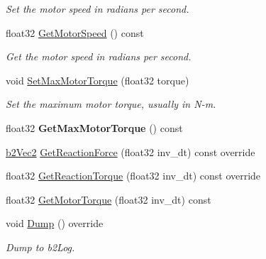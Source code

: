 \begin{DoxyCompactItemize}
\begin{DoxyCompactList}\small\item\em Set the motor speed in radians per second. \end{DoxyCompactList}\item 
\mbox{\label{classb2RevoluteJoint_abb1fa43d5779a1164ddfedf6130d7ff2}} 
float32 \mbox{\hyperlink{classb2RevoluteJoint_abb1fa43d5779a1164ddfedf6130d7ff2}{Get\+Motor\+Speed}} () const
\begin{DoxyCompactList}\small\item\em Get the motor speed in radians per second. \end{DoxyCompactList}\item 
\mbox{\label{classb2RevoluteJoint_a41779d7ec05be33e6368ef00123a3581}} 
void \mbox{\hyperlink{classb2RevoluteJoint_a41779d7ec05be33e6368ef00123a3581}{Set\+Max\+Motor\+Torque}} (float32 torque)
\begin{DoxyCompactList}\small\item\em Set the maximum motor torque, usually in N-\/m. \end{DoxyCompactList}\item 
\mbox{\label{classb2RevoluteJoint_a878308eb3e299e15ac9dc88d48671d51}} 
float32 {\bfseries Get\+Max\+Motor\+Torque} () const
\item 
\mbox{\hyperlink{structb2Vec2}{b2\+Vec2}} \mbox{\hyperlink{classb2RevoluteJoint_abeb7bf941589aed0d7f330a578a62024}{Get\+Reaction\+Force}} (float32 inv\+\_\+dt) const override
\item 
float32 \mbox{\hyperlink{classb2RevoluteJoint_aab61a3f330aa93ae28f657e36bc3db51}{Get\+Reaction\+Torque}} (float32 inv\+\_\+dt) const override
\item 
float32 \mbox{\hyperlink{classb2RevoluteJoint_a5abafb4d0c1df642f73a5d9faf615e26}{Get\+Motor\+Torque}} (float32 inv\+\_\+dt) const
\item 
\mbox{\label{classb2RevoluteJoint_a408badabe21b169412a5c4a2f36bbbd8}} 
void \mbox{\hyperlink{classb2RevoluteJoint_a408badabe21b169412a5c4a2f36bbbd8}{Dump}} () override
\begin{DoxyCompactList}\small\item\em Dump to b2\+Log. \end{DoxyCompactList}\end{DoxyCompactItemize}
